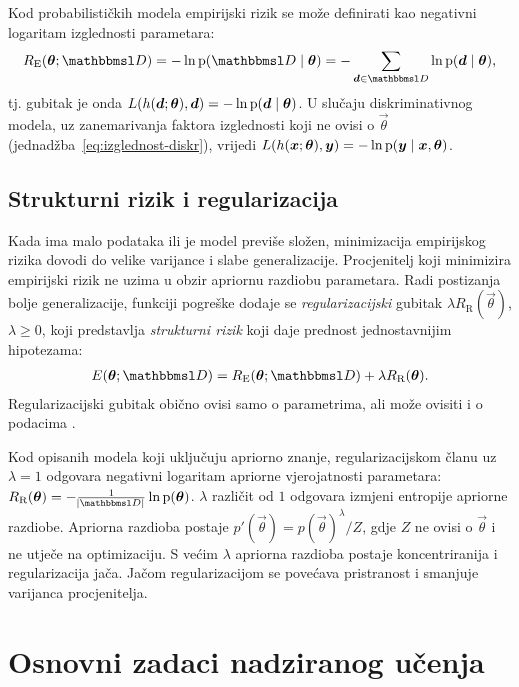 \documentclass[utf8, diplomski, lmodern]{fer}
\begin{document}
Kod probabilističkih modela empirijski rizik se može definirati kao negativni logaritam izglednosti parametara:
\begin{align}
R_\text{E}(\vec\theta;\set{D}) = -\ln\p(\set{D}\mid\vec\theta) = -\sum_{\vec d\in\set{D}} \ln\p(\vec d\mid\vec\theta) \text{,}
\end{align}
tj. gubitak je onda $L(h(\vec d;\vec\theta), \vec d) = -\ln\p(\vec d\mid\vec\theta)$. U slučaju diskriminativnog modela, uz zanemarivanja faktora izglednosti koji ne ovisi o $\vec\theta$ (jednadžba~\eqref{eq:izglednost-diskr}), vrijedi $L(h(\vec x;\vec\theta), \vec y) = -\ln\p(\vec y\mid\vec x,\vec\theta)$.

\subsection{Strukturni rizik i regularizacija}

Kada ima malo podataka ili je model previše složen, minimizacija empirijskog rizika dovodi do velike varijance i slabe generalizacije. Procjenitelj koji minimizira empirijski rizik ne uzima u obzir apriornu razdiobu parametara. Radi postizanja bolje generalizacije, funkciji pogreške dodaje se \emph{regularizacijski} gubitak $\lambda R_\text{R}(\vec\theta)$, $\lambda\geq0$, koji predstavlja \emph{strukturni rizik} koji daje prednost jednostavnijim hipotezama:
\begin{align}
E(\vec\theta;\set{D}) = R_\text{E}(\vec\theta;\set{D}) + \lambda R_\text{R}(\vec\theta) \text{.}
\end{align}
Regularizacijski gubitak obično ovisi samo o parametrima, ali može ovisiti i o podacima \citep{Goodfellow:2016:DL}.

Kod opisanih modela koji uključuju apriorno znanje, regularizacijskom članu uz $\lambda=1$ odgovara negativni logaritam apriorne vjerojatnosti parametara: $R_\text{R}(\vec\theta) = -\frac{1}{\envert{\set{D}}}\ln\p(\vec\theta)$. $\lambda$ različit od $1$ odgovara izmjeni entropije apriorne razdiobe. Apriorna razdioba postaje $p'(\vec\theta)=p(\vec\theta)^\lambda/Z$, gdje $Z$ ne ovisi o $\vec\theta$ i ne utječe na optimizaciju. S većim $\lambda$ apriorna razdioba postaje koncentriranija i regularizacija jača. Jačom regularizacijom se povećava pristranost i smanjuje varijanca procjenitelja.



\section{Osnovni zadaci nadziranog učenja}
\end{document}
